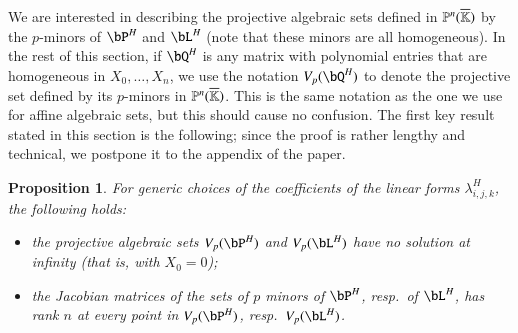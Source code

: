 \documentclass[amsthm]{elsart}
\newtheorem{proposition}[definition]{Proposition}
\begin{document}
We are interested in describing the projective algebraic sets defined
in $\mathbb{P}^n(\overline{\mathbb{K}})$ by the $p$-minors of $\bP^H$ and $\bL^H$ (note that
these minors are all homogeneous). In the rest of this section, if
$\bQ^H$ is any matrix with polynomial entries that are homogeneous in
$X_0,\dots,X_n$, we use the notation $V_p(\bQ^H)$ to denote the
projective set defined by its $p$-minors in $\mathbb{P}^n(\overline{\mathbb{K}})$.  This is
the same notation as the one we use for affine algebraic sets, but
this should cause no confusion. The first key result stated in this
section is the following; since the proof is rather lengthy and
technical, we postpone it to the appendix of the paper.

\begin{proposition}\label{lemma:appendix}
  For generic choices of the coefficients of the linear forms
  $\lambda^H_{i,j,k}$, the following holds:
  \begin{itemize}
  \item the projective algebraic sets $V_p(\bP^H)$ and $V_p(\bL^H)$
    have no solution at infinity (that is, with $X_0=0$);
  \item the Jacobian matrices of the sets of $p$ minors 
    of $\bP^H$, resp.\ of $\bL^H$, has rank $n$ at every point 
    in $V_p(\bP^H)$, resp.\ $V_p(\bL^H)$.
\end{itemize}
\end{proposition}
\end{document}
